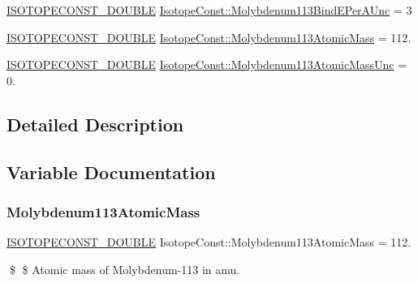 \begin{DoxyCompactItemize}
\mbox{\hyperlink{group___isotope_const-_macros_ga8f45a7272ce02c0b4c65c44636ed719a}{I\+S\+O\+T\+O\+P\+E\+C\+O\+N\+S\+T\+\_\+\+D\+O\+U\+B\+LE}} \mbox{\hyperlink{group___isotope_const-_molybdenum-_mo113_gaaa5ac95a09ccd0d38a715301a6af7cdb}{Isotope\+Const\+::\+Molybdenum113\+Bind\+E\+Per\+A\+Unc}} = 3
\item 
\mbox{\hyperlink{group___isotope_const-_macros_ga8f45a7272ce02c0b4c65c44636ed719a}{I\+S\+O\+T\+O\+P\+E\+C\+O\+N\+S\+T\+\_\+\+D\+O\+U\+B\+LE}} \mbox{\hyperlink{group___isotope_const-_molybdenum-_mo113_gaf1831c2f0b7a8e8d65a9f2b15565a206}{Isotope\+Const\+::\+Molybdenum113\+Atomic\+Mass}} = 112.
\item 
\mbox{\hyperlink{group___isotope_const-_macros_ga8f45a7272ce02c0b4c65c44636ed719a}{I\+S\+O\+T\+O\+P\+E\+C\+O\+N\+S\+T\+\_\+\+D\+O\+U\+B\+LE}} \mbox{\hyperlink{group___isotope_const-_molybdenum-_mo113_ga258a6d0150141f77169e4b9a468e6bee}{Isotope\+Const\+::\+Molybdenum113\+Atomic\+Mass\+Unc}} = 0.
\end{DoxyCompactItemize}


\subsection{Detailed Description}


\subsection{Variable Documentation}
\mbox{\label{group___isotope_const-_molybdenum-_mo113_gaf1831c2f0b7a8e8d65a9f2b15565a206}} 
\subsubsection{\texorpdfstring{Molybdenum113\+Atomic\+Mass}{Molybdenum113AtomicMass}}
{\footnotesize\ttfamily \mbox{\hyperlink{group___isotope_const-_macros_ga8f45a7272ce02c0b4c65c44636ed719a}{I\+S\+O\+T\+O\+P\+E\+C\+O\+N\+S\+T\+\_\+\+D\+O\+U\+B\+LE}} Isotope\+Const\+::\+Molybdenum113\+Atomic\+Mass = 112.}

\$ \$ Atomic mass of Molybdenum-\/113 in amu. \mbox{\label{group___isotope_const-_molybdenum-_mo113_ga258a6d0150141f77169e4b9a468e6bee}} 
